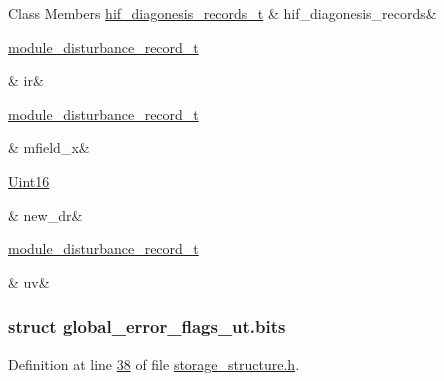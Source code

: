 \begin{DoxyFields}{Class Members}
\hypertarget{a00003_a460063751aa45dc40586a73349e4e381}{\hyperlink{a00003_a4726b814166e222a6f13e21453f76d8d}{hif\+\_\+diagonesis\+\_\+records\+\_\+t}}\label{a00003_a460063751aa45dc40586a73349e4e381}
&
hif\+\_\+diagonesis\+\_\+records&
\\
\hline

\hypertarget{a00003_a0853f30aaeea71d87e16b602c74d6f1e}{\hyperlink{a00008}{module\+\_\+disturbance\+\_\+record\+\_\+t}}\label{a00003_a0853f30aaeea71d87e16b602c74d6f1e}
&
ir&
\\
\hline

\hypertarget{a00003_a241d2538d580d57649cce4000fc4c743}{\hyperlink{a00008}{module\+\_\+disturbance\+\_\+record\+\_\+t}}\label{a00003_a241d2538d580d57649cce4000fc4c743}
&
mfield\+\_\+x&
\\
\hline

\hypertarget{a00003_a86fcaabe527af58a854c14bc6fd79ef1}{\hyperlink{a00001_aae7407b021d43f7193a81a58cfb3e297}{Uint16}}\label{a00003_a86fcaabe527af58a854c14bc6fd79ef1}
&
new\+\_\+dr&
\\
\hline

\hypertarget{a00003_a495d761510e9f18ac4788986eccc5059}{\hyperlink{a00008}{module\+\_\+disturbance\+\_\+record\+\_\+t}}\label{a00003_a495d761510e9f18ac4788986eccc5059}
&
uv&
\\
\hline

\end{DoxyFields}
\label{d1/d09/a00077}
\hypertarget{a00003_d1/d09/a00077}{}
\subsubsection{struct global\+\_\+error\+\_\+flags\+\_\+ut.\+bits}


Definition at line \hyperlink{a00003_source_l00038}{38} of file \hyperlink{a00003_source}{storage\+\_\+structure.\+h}.




